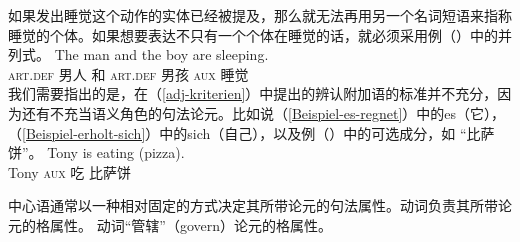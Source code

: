 如果发出睡觉这个动作的实体已经被提及，那么就无法再用另一个名词短语来指称睡觉的个体。如果想要表达不只有一个个体在睡觉的话，就必须采用例（）中的并列式。
\ea
\gll The man and the boy are sleeping.\\
      \textsc{art}.\textsc{def} 男人 和 \textsc{art}.\textsc{def} 男孩  \textsc{aux} 睡觉\\
\z
我们需要指出的是，在（\ref{adj-kriterien}）中提出的辨认附加语的标准并不充分，因为还有不充当语义角色的句法论元。比如说（\ref{Beispiel-es-regnet}）中的es（它），（\ref{Beispiel-erholt-sich}）中的sich（自己），以及例（）中的可选成分，如 “比萨饼”。
\ea
\gll Tony is           eating (pizza). \\
     Tony \textsc{aux} 吃     比萨饼\\
\z

\noindent
中心语通常以一种相对固定的方式决定其所带论元的句法属性。动词负责其所带论元的格属性。
\eal
{}
\zl
动词“管辖”（govern）论元的格属性。

